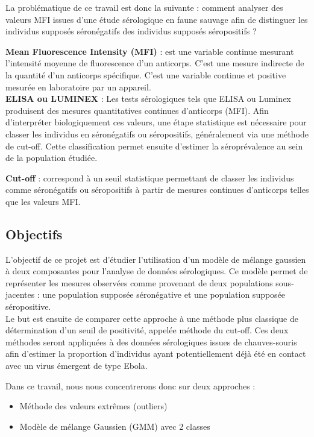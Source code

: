 \documentclass[a4paper]{article}
\begin{document}
La problématique de ce travail est donc la suivante : comment analyser des valeurs MFI issues d’une étude sérologique en faune sauvage afin de distinguer les individus supposés séronégatifs des individus supposés séropositifs ?



\textbf{Mean Fluorescence Intensity (MFI)} : est une variable continue mesurant l'intensité moyenne de fluorescence d'un anticorps. C'est une mesure indirecte de la quantité d'un anticorps spécifique. C'est une variable continue et positive mesurée en laboratoire par un appareil.\\

\textbf{ELISA ou LUMINEX} : Les tests sérologiques tels que ELISA ou Luminex produisent des mesures quantitatives continues d’anticorps (MFI). Afin d’interpréter biologiquement ces valeurs, une étape statistique est nécessaire pour classer les individus en séronégatifs ou séropositifs, généralement via une méthode de cut-off. Cette classification permet ensuite d’estimer la séroprévalence au sein de la population étudiée.

\textbf{Cut-off} : correspond à un seuil statistique permettant de classer les individus comme séronégatifs ou séropositifs à partir de mesures continues d’anticorps telles que les valeurs MFI.

\subsection{Objectifs}

L’objectif de ce projet est d’étudier l’utilisation d’un modèle de mélange gaussien à deux composantes pour l’analyse de données sérologiques. Ce modèle permet de représenter les mesures observées comme provenant de deux populations sous-jacentes : une population supposée séronégative et une population supposée séropositive. \\
Le but est ensuite de comparer cette approche à une méthode plus classique de détermination d’un seuil de positivité, appelée méthode du cut-off. Ces deux méthodes seront appliquées à des données sérologiques issues de chauves-souris afin d’estimer la proportion d’individus ayant potentiellement déjà été en contact avec un virus émergent de type Ebola.

Dans ce travail, nous nous concentrerons donc sur deux approches :
\begin{itemize}
    \item Méthode des valeurs extrêmes (outliers)
    \item Modèle de mélange Gaussien (GMM) avec 2 classes
\end{itemize}
\end{document}
